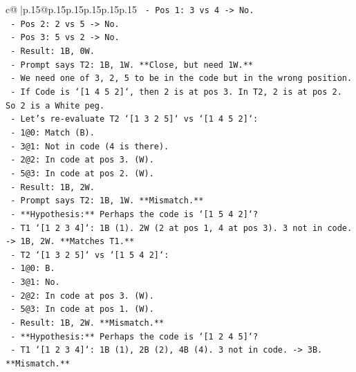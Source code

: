 \documentclass{article}
\begin{document}
{\begin{supertabular}{c@{$\;$}|p{.15\linewidth}@{}p{.15\linewidth}p{.15\linewidth}p{.15\linewidth}p{.15\linewidth}p{.15\linewidth}}
{{{\texttt{                  {-} Pos 1: 3 vs 4 {-}> No.} \\
\texttt{                  {-} Pos 2: 2 vs 5 {-}> No.} \\
\texttt{                  {-} Pos 3: 5 vs 2 {-}> No.} \\
\texttt{                  {-} Result: 1B, 0W.} \\
\texttt{                  {-} Prompt says T2: 1B, 1W. **Close, but need 1W.**} \\
\texttt{                  {-} We need one of 3, 2, 5 to be in the code but in the wrong position.} \\
\texttt{                  {-} If Code is `{[}1 4 5 2{]}`, then 2 is at pos 3. In T2, 2 is at pos 2. So 2 is a White peg.} \\
\texttt{                  {-} Let's re{-}evaluate T2 `{[}1 3 2 5{]}` vs `{[}1 4 5 2{]}`:} \\
\texttt{                    {-} 1@0: Match (B).} \\
\texttt{                    {-} 3@1: Not in code (4 is there).} \\
\texttt{                    {-} 2@2: In code at pos 3. (W).} \\
\texttt{                    {-} 5@3: In code at pos 2. (W).} \\
\texttt{                    {-} Result: 1B, 2W.} \\
\texttt{                    {-} Prompt says T2: 1B, 1W. **Mismatch.**} \\
\texttt{              {-} **Hypothesis:** Perhaps the code is `{[}1 5 4 2{]}`?} \\
\texttt{                {-} T1 `{[}1 2 3 4{]}`: 1B (1). 2W (2 at pos 1, 4 at pos 3). 3 not in code. {-}> 1B, 2W. **Matches T1.**} \\
\texttt{                {-} T2 `{[}1 3 2 5{]}` vs `{[}1 5 4 2{]}`:} \\
\texttt{                  {-} 1@0: B.} \\
\texttt{                  {-} 3@1: No.} \\
\texttt{                  {-} 2@2: In code at pos 3. (W).} \\
\texttt{                  {-} 5@3: In code at pos 1. (W).} \\
\texttt{                  {-} Result: 1B, 2W. **Mismatch.**} \\
\texttt{              {-} **Hypothesis:** Perhaps the code is `{[}1 2 4 5{]}`?} \\
\texttt{                {-} T1 `{[}1 2 3 4{]}`: 1B (1), 2B (2), 4B (4). 3 not in code. {-}> 3B. **Mismatch.**} \\
}}}
\end{supertabular}}
\end{document}
